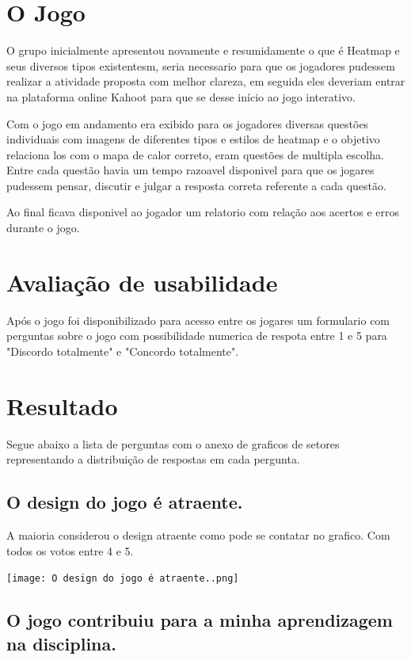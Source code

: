 \documentclass[12pt]{article}
\begin{document}
\section{O Jogo}

O grupo inicialmente apresentou novamente e resumidamente o que é Heatmap e seus diversos tipos existentesm, seria necessario para que os jogadores pudessem realizar a atividade proposta com melhor clareza, em seguida eles deveriam entrar na plataforma online Kahoot para que se desse início ao jogo interativo.

Com o jogo em andamento era exibido para os jogadores diversas questões individuais com imagens de diferentes tipos e estilos de heatmap e o objetivo relaciona los com o mapa de calor correto, eram questões de multipla escolha. Entre cada questão havia um tempo razoavel disponivel para que os jogares pudessem pensar, discutir e julgar a resposta correta referente a cada questão.

Ao final ficava disponivel ao jogador um relatorio com relação aos acertos e erros durante o jogo.

\section{Avaliação de usabilidade}

Após o jogo foi disponibilizado para acesso entre os jogares um formulario com perguntas sobre o jogo com possibilidade numerica de respota entre 1 e 5 para "Discordo totalmente" e "Concordo totalmente".

\section{Resultado}

Segue abaixo a lista de perguntas com o anexo de graficos de setores representando a distribuição de respostas em cada pergunta.

\subsection{O design do jogo é atraente.}

A maioria considerou o design atraente como pode se contatar no grafico. Com todos os votos entre 4 e 5.

\begin{center}
  \texttt{[image: O design do jogo é atraente..png]}
\end{center}


\subsection{O jogo contribuiu para a minha aprendizagem na disciplina.}
\end{document}
